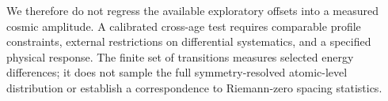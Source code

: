 We therefore do not regress the available exploratory offsets into a measured cosmic amplitude. A calibrated cross-age test requires comparable profile constraints, external restrictions on differential systematics, and a specified physical response. The finite set of transitions measures selected energy differences; it does not sample the full symmetry-resolved atomic-level distribution or establish a correspondence to Riemann-zero spacing statistics.
